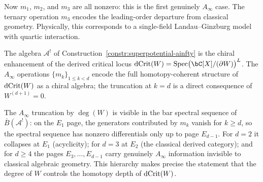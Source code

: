 \begin{example}[$d = 4$: quartic potential, $W = \tfrac{1}{24}X^4$]
\label{ex:superpotential-d4}
Now $m_1$, $m_2$, and $m_3$ are all nonzero: this is the first genuinely
$A_\infty$ case. The ternary operation $m_3$ encodes the leading-order
departure from classical geometry. Physically, this corresponds to a
single-field Landau--Ginzburg model with quartic interaction.
\end{example}

\begin{proposition}
\label{prop:chiral-dcrit}
The algebra $\mathcal{A}^!$ of Construction~\ref{constr:superpotential-ainfty}
is the chiral enhancement of the derived critical locus
$\dCrit(W) = \operatorname{Spec}\bigl(\bC[X]/(\partial W)\bigr)^L$.
The $A_\infty$ operations $\{m_k\}_{1 \leq k < d}$ encode the full
homotopy-coherent structure of $\mathrm{dCrit}(W)$ as a chiral algebra; the
truncation at $k = d$ is a direct consequence of $W^{(d+1)} = 0$.
\end{proposition}

\begin{remark}
\label{rem:superpotential-bar-ss}
The $A_\infty$ truncation by $\deg(W)$ is visible in the bar spectral
sequence of $\bar{B}(\mathcal{A}^!)$: on the $E_1$ page, the generators
contributed by $m_k$ vanish for $k \geq d$, so the spectral sequence has
nonzero differentials only up to page $E_{d-1}$. For $d = 2$ it
collapses at $E_1$ (acyclicity); for $d = 3$ at $E_2$ (the classical
derived category); and for $d \geq 4$ the pages $E_3, \ldots, E_{d-1}$
carry genuinely $A_\infty$ information invisible to classical algebraic
geometry. This hierarchy makes precise the statement that the degree
of $W$ controls the homotopy depth of $\mathrm{dCrit}(W)$.
\end{remark}

